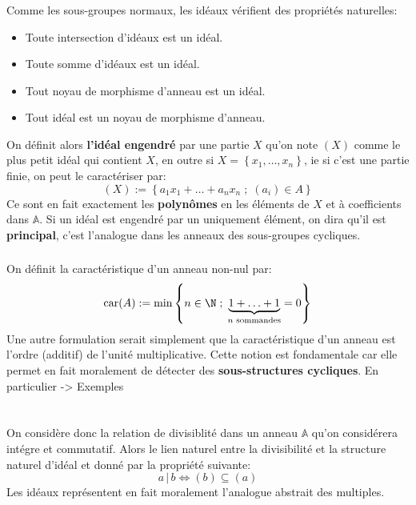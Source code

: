 \subsection*{}
Comme les sous-groupes normaux, les idéaux vérifient des propriétés naturelles:
\begin{itemize}
   \item Toute intersection d'idéaux est un idéal.
   \item Toute somme d'idéaux est un idéal.
   \item Tout noyau de morphisme d'anneau est un idéal.
   \item Tout idéal est un noyau de morphisme d'anneau.
\end{itemize}
On définit alors \textbf{l'idéal engendré} par une partie \(X\) qu'on note \( (X) \) comme le plus petit idéal qui contient \( X \), en outre si \( X = \left\{ x_1, \ldots, x_n \right\}  \), ie si c'est une partie finie, on peut le caractériser par:
\[ 
   (X) := \left\{ a_1x_1 + \ldots + a_nx_n \; ; \; (a_i) \in A \right\}  
\]
Ce sont en fait exactement les \textbf{polynômes} en les éléments de \( X \) et à coefficients dans \( \mathbb{A} \). Si un idéal est engendré par un uniquement élément, on dira qu'il est \textbf{principal}, c'est l'analogue dans les anneaux des sous-groupes cycliques.

\subsection*{}
On définit la caractéristique d'un anneau non-nul par:
\[
   \text{car}(A) := \min \left\{ n \in \N \; ; \;\underbrace{1 + \ldots + 1}_{\text{\(n\) sommandes}} = 0 \right\}
\]
Une autre formulation serait simplement que la caractéristique d'un anneau est l'ordre (additif) de l'unité multiplicative. Cette notion est fondamentale car elle permet en fait moralement de détecter des \textbf{sous-structures cycliques}. En particulier -> Exemples


\chapter*{}
On considère donc la relation de divisiblité dans un anneau \( \mathbb{A} \) qu'on considérera intégre et commutatif. Alors le lien naturel entre la divisibilité et la structure naturel d'idéal et donné par la propriété suivante:
\[ 
   a \, \big| \, b \iff (b) \subseteq (a) 
\]
Les idéaux représentent en fait moralement l'analogue abstrait des multiples.
